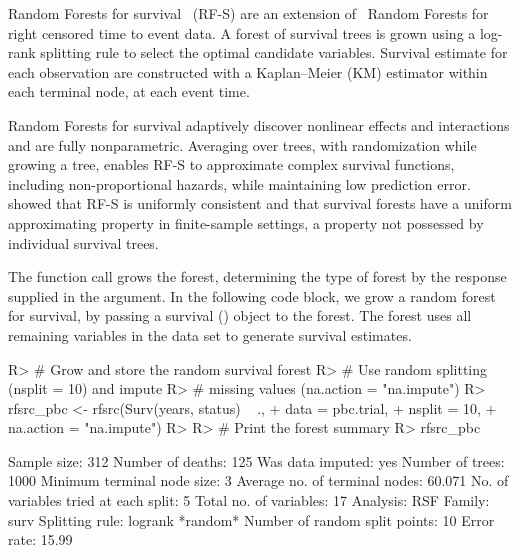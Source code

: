\documentclass[nojss]{jss}\usepackage[]{graphicx}\usepackage[]{color}
\begin{document}
Random Forests for survival~\citep{Ishwaran:2007, Ishwaran:2008} (RF-S) are an extension of~\cite{Breiman:2001} Random Forests for right censored time to event data. A forest of survival trees is grown using a log-rank splitting rule to select the optimal candidate variables. Survival estimate for each observation are constructed with a Kaplan--Meier (KM) estimator within each terminal node, at each event time. 

Random Forests for survival adaptively discover nonlinear effects and interactions and are fully nonparametric. Averaging over trees, with randomization while growing a tree, enables RF-S to approximate complex survival functions, including non-proportional hazards, while maintaining low prediction error. \cite{Ishwaran:2010a} showed that RF-S is uniformly consistent and that survival forests have a uniform approximating property in finite-sample settings, a property not possessed by individual survival trees.

The   function call grows the forest, determining the type of forest by the response supplied in the  argument. In the following code block, we grow a random forest for survival, by passing a survival () object to the forest. The forest uses all remaining variables in the  data set to generate survival estimates. 

\begin{Schunk}
\begin{Sinput}
R> # Grow and store the random survival forest
R> # Use random splitting (nsplit = 10) and impute 
R> # missing values (na.action = "na.impute")
R> rfsrc_pbc <- rfsrc(Surv(years, status) ~ ., 
+                    data = pbc.trial, 
+                    nsplit = 10, 
+                    na.action = "na.impute")
R> 
R> # Print the forest summary
R> rfsrc_pbc
\end{Sinput}
\end{Schunk}

\begin{Schunk}
\begin{Soutput}
                         Sample size: 312
                    Number of deaths: 125
                    Was data imputed: yes
                     Number of trees: 1000
          Minimum terminal node size: 3
       Average no. of terminal nodes: 60.071
No. of variables tried at each split: 5
              Total no. of variables: 17
                            Analysis: RSF
                              Family: surv
                      Splitting rule: logrank *random*
       Number of random split points: 10
                          Error rate: 15.99%
\end{Soutput}
\end{Schunk}
\end{document}
